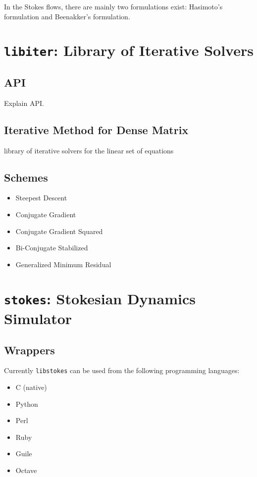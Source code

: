 \documentclass{book}
\begin{document}
In the Stokes flows, there are mainly two formulations exist:
Hasimoto's formulation\cite{Hasimoto1959}
and Beenakker's formulation\cite{Beenakker1986}.




\chapter{{\tt libiter}: Library of Iterative Solvers}
\label{chp:libiter}
\section{API}
Explain API.

\section{Iterative Method for Dense Matrix}
library of iterative solvers for the linear set of equations
\cite{ichiki2001}


\section{Schemes}
\begin{itemize}
\item Steepest Descent
\item Conjugate Gradient
\item Conjugate Gradient Squared
\item Bi-Conjugate Stabilized
\item Generalized Minimum Residual
\end{itemize}



\chapter{{\tt stokes}: Stokesian Dynamics Simulator}
\label{chp:stokes}

\section{Wrappers}
Currently {\tt libstokes} can be used from the following programming languages:
\begin{itemize}
\item C (native)
\item Python
\item Perl
\item Ruby
\item Guile
\item Octave
\end{itemize}
\end{document}
